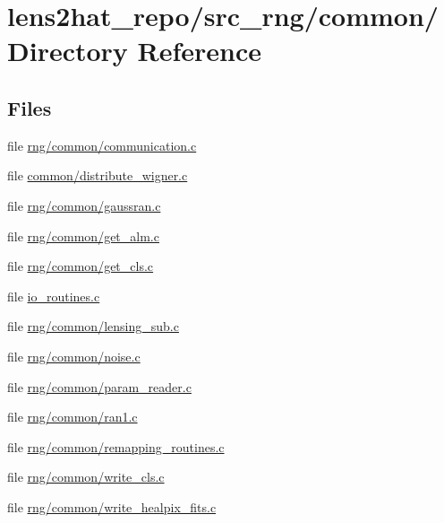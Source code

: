 \section{lens2hat\-\_\-repo/src\-\_\-rng/common/ Directory Reference}
\label{dir_88e96303b79e61c75f31dec8de0189e7}
\subsection*{Files}
\begin{DoxyCompactItemize}
\item 
file \hyperlink{rng_2common_2communication_8c}{rng/common/communication.\-c}
\item 
file \hyperlink{common_2distribute__wigner_8c}{common/distribute\-\_\-wigner.\-c}
\item 
file \hyperlink{rng_2common_2gaussran_8c}{rng/common/gaussran.\-c}
\item 
file \hyperlink{rng_2common_2get__alm_8c}{rng/common/get\-\_\-alm.\-c}
\item 
file \hyperlink{rng_2common_2get__cls_8c}{rng/common/get\-\_\-cls.\-c}
\item 
file \hyperlink{io__routines_8c}{io\-\_\-routines.\-c}
\item 
file \hyperlink{rng_2common_2lensing__sub_8c}{rng/common/lensing\-\_\-sub.\-c}
\item 
file \hyperlink{rng_2common_2noise_8c}{rng/common/noise.\-c}
\item 
file \hyperlink{rng_2common_2param__reader_8c}{rng/common/param\-\_\-reader.\-c}
\item 
file \hyperlink{rng_2common_2ran1_8c}{rng/common/ran1.\-c}
\item 
file \hyperlink{rng_2common_2remapping__routines_8c}{rng/common/remapping\-\_\-routines.\-c}
\item 
file \hyperlink{rng_2common_2write__cls_8c}{rng/common/write\-\_\-cls.\-c}
\item 
file \hyperlink{rng_2common_2write__healpix__fits_8c}{rng/common/write\-\_\-healpix\-\_\-fits.\-c}
\end{DoxyCompactItemize}
